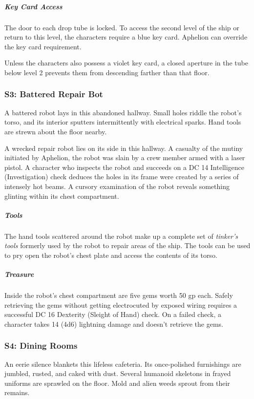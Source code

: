 \documentclass[10pt,a4paper,twoside,bg=print,twocolumn,openany,nodeprecatedcode]{dndbook}
\begin{document}
\subparagraph{Key Card Access}
The door to each drop tube is locked. To access the second level of the ship or return to this level, the characters require a blue key card. Aphelion can override the key card requirement.

Unless the characters also possess a violet key card, a closed aperture in the tube below level 2 prevents them from descending farther than that floor.

\subsubsection{S3: Battered Repair Bot}
\begin{DndReadAloud}{}
A battered robot lays in this abandoned hallway. Small holes riddle the robot's torso, and its interior sputters intermittently with electrical sparks. Hand tools are strewn about the floor nearby.

\end{DndReadAloud}

A wrecked repair robot lies on its side in this hallway. A casualty of the mutiny initiated by Aphelion, the robot was slain by a crew member armed with a laser pistol. A character who inspects the robot and succeeds on a DC 14 Intelligence (Investigation) check deduces the holes in its frame were created by a series of intensely hot beams. A cursory examination of the robot reveals something glinting within its chest compartment.

\subparagraph{Tools}
The hand tools scattered around the robot make up a complete set of \textit{tinker's tools} formerly used by the robot to repair areas of the ship. The tools can be used to pry open the robot's chest plate and access the contents of its torso.

\subparagraph{Treasure}
Inside the robot's chest compartment are five gems worth 50 gp each. Safely retrieving the gems without getting electrocuted by exposed wiring requires a successful DC 16 Dexterity (Sleight of Hand) check. On a failed check, a character takes 14 (4d6) lightning damage and doesn't retrieve the gems.

\subsubsection{S4: Dining Rooms}
\begin{DndReadAloud}{}
An eerie silence blankets this lifeless cafeteria. Its once-polished furnishings are jumbled, rusted, and caked with dust. Several humanoid skeletons in frayed uniforms are sprawled on the floor. Mold and alien weeds sprout from their remains.

\end{DndReadAloud}
\end{document}
